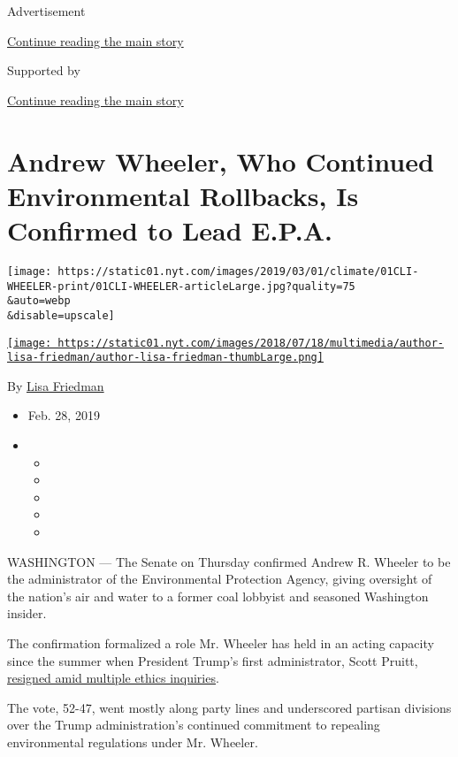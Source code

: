 Advertisement

\protect\hyperlink{after-top}{Continue reading the main story}

Supported by

\protect\hyperlink{after-sponsor}{Continue reading the main story}

\hypertarget{andrew-wheeler-who-continued-environmental-rollbacks-is-confirmed-to-lead-epa}{%
\section{Andrew Wheeler, Who Continued Environmental Rollbacks, Is
Confirmed to Lead
E.P.A.}\label{andrew-wheeler-who-continued-environmental-rollbacks-is-confirmed-to-lead-epa}}

\texttt{[image: https://static01.nyt.com/images/2019/03/01/climate/01CLI-WHEELER-print/01CLI-WHEELER-articleLarge.jpg?quality=75\\\&auto=webp\\\&disable=upscale]}

\href{https://www.nytimes.com/by/lisa-friedman}{\texttt{[image: https://static01.nyt.com/images/2018/07/18/multimedia/author-lisa-friedman/author-lisa-friedman-thumbLarge.png]}}

By \href{https://www.nytimes.com/by/lisa-friedman}{Lisa Friedman}

\begin{itemize}
\item
  Feb. 28, 2019
\item
  \begin{itemize}
  \item
  \item
  \item
  \item
  \item
  \end{itemize}
\end{itemize}

WASHINGTON --- The Senate on Thursday confirmed Andrew R. Wheeler to be
the administrator of the Environmental Protection Agency, giving
oversight of the nation's air and water to a former coal lobbyist and
seasoned Washington insider.

The confirmation formalized a role Mr. Wheeler has held in an acting
capacity since the summer when President Trump's first administrator,
Scott Pruitt,
\href{https://www.nytimes.com/2018/07/05/climate/scott-pruitt-epa-trump.html}{resigned
amid multiple ethics inquiries}.

The vote, 52-47, went mostly along party lines and underscored partisan
divisions over the Trump administration's continued commitment to
repealing environmental regulations under Mr. Wheeler.

